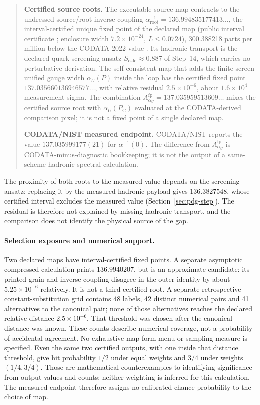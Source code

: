 \documentclass[11pt]{article}
\theoremstyle{remark}
\newcommand{\alphainv}{\alpha^{-1}}
\newcommand{\Ppub}{P_{\mathrm C}}
\begin{document}
\begin{quote}\small
\textbf{Certified source roots.} The executable source map contracts to the
undressed source/root inverse coupling
\(\alphainv_{\mathrm{root}}=136.994835177413\ldots\), the
interval-certified unique fixed point of the declared map (public interval
certificate \cite{oph-code}; enclosure width \(7.2\times10^{-24}\),
\(L\le0.0724\)), 300.388218 parts per million below the CODATA 2022 value
\cite{ophpredictions}. Its hadronic transport is the declared
quark-screening ansatz \(S_{\mathrm{calc}}\approx0.887\) of Step~14, which
carries no perturbative derivation. The self-consistent map that adds the
finite-screen unified gauge width \(\alpha_U(P)\) inside the loop has the
certified fixed point \(137.035660136946577\ldots\), with relative residual
\(2.5\times10^{-6}\), about \(1.6\times10^{4}\) measurement sigma. The
combination \(A_{\alpha_U}^{\mathrm{fp}}=137.035959513609\ldots\) mixes the
certified source root with \(\alpha_U(\Ppub)\) evaluated at the
CODATA-derived comparison pixel; it is not a fixed point of a single
declared map.

\textbf{CODATA\slash NIST measured endpoint.} CODATA\slash NIST reports the
value \(137.035999177(21)\) for \(\alphainv(0)\). The difference from
\(A_{\alpha_U}^{\mathrm{fp}}\) is CODATA-minus-diagnostic bookkeeping; it is
not the output of a same-scheme hadronic spectral calculation.
\end{quote}

The proximity of both roots to the measured value depends on the screening
ansatz: replacing it by the measured hadronic payload gives
\(136.3827548\), whose certified interval excludes the measured value
(Section~\ref{sec:pdg-step}). The residual is therefore not explained by
missing hadronic transport, and the comparison does not identify the
physical source of the gap.

\paragraph*{Selection exposure and numerical support.}
Two declared maps have interval-certified fixed points. A separate
asymptotic compressed calculation prints \(136.9940207\), but is an
approximate candidate: its printed grain and inverse coupling disagree in
the outer identity by about \(5.25\times10^{-6}\) relatively. It is not a
third certified root. A separate retrospective constant-substitution grid
contains 48 labels, 42 distinct numerical pairs and 41 alternatives to the
canonical pair; none of those alternatives reaches the declared relative
distance \(2.5\times10^{-6}\). That threshold was chosen after the canonical
distance was known. These counts describe numerical coverage, not a
probability of accidental agreement. No exhaustive map-form menu or
sampling measure is specified. Even the same two certified outputs,
with one inside that distance threshold, give hit probability \(1/2\) under
equal weights and \(3/4\) under weights \((1/4,3/4)\). Those are mathematical
counterexamples to identifying significance from output values and counts;
neither weighting is inferred for this calculation. The measured endpoint
therefore assigns no calibrated chance probability to the choice of map.
\end{document}
